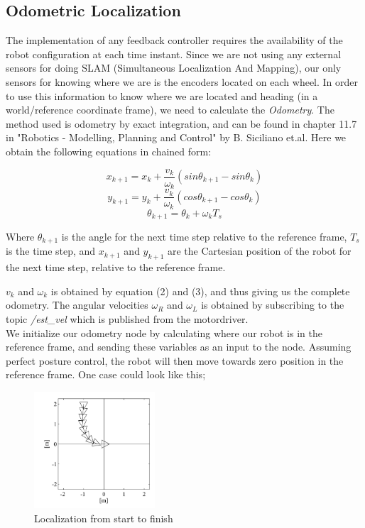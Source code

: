 \documentclass[a4paper,10pt]{article}
\begin{document}
\subsection{Odometric Localization}

		The implementation of any feedback controller requires the availability of the robot configuration at each time instant. Since we are not using any external sensors for doing SLAM
		(Simultaneous Localization And Mapping), our only sensors for knowing where we are is the encoders located on each wheel. In order to use this information to know where we are located
		and heading (in a world/reference coordinate frame), we need to calculate the \emph{Odometry}. The method used is odometry by exact integration, and can be found in chapter 11.7 in
		"Robotics - Modelling, Planning and Control" by B. Siciliano et.al. Here we obtain the following equations in chained form:
		
		\begin{equation}
		x_{k+1}=x_k+\frac{v_k}{\omega_k}(sin\theta_{k+1}-sin\theta_k)
		\end{equation}
		\begin{equation}
		y_{k+1}=y_k+\frac{v_k}{\omega_k}(cos\theta_{k+1}-cos\theta_k)
		\end{equation}
		\begin{equation}
		\theta_{k+1}=\theta_k+\omega_kT_s
		\end{equation}
		
		Where $\theta_{k+1}$ is the angle for the next time step relative to the reference frame, $T_s$ is the time step, and $x_{k+1}$ and $y_{k+1}$ are the Cartesian position of the robot for
		the next time step, relative to the reference frame.

		$v_k$ and $\omega_k$ is obtained by equation (2) and (3), and thus giving us the complete odometry. The angular velocities $\omega_R$  and $\omega_L$ is obtained by subscribing to
		the topic \textit{/est\_vel} which is published from the motordriver.\\

		We initialize our odometry node by calculating where our robot is in the reference frame, and sending these variables as an input to the node. Assuming perfect posture control, the robot will
		then move towards zero position in the reference frame. One case could look like this;


		\begin{figure}[H]
		\centering
		\includegraphics[width=0.4\textwidth]{odometric_localization_config.JPG}
		\caption{Localization from start to finish}	
		\end{figure}
\end{document}
